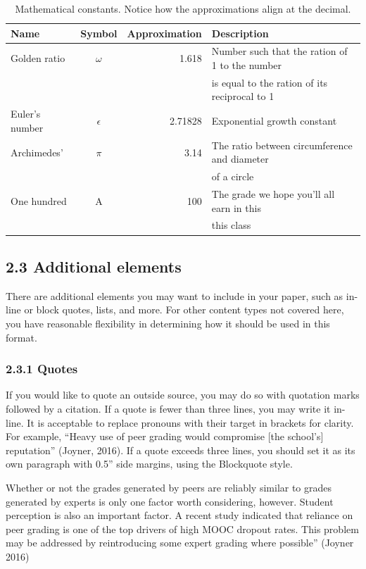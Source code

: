 {{{{\begin{table}[H]
  \centering
  \caption{Mathematical constants. Notice how the approximations align at the decimal.}
  \label{table:1}
  \begin{tabular}{l|c|r|l}
    \textbf{Name} & \textbf{Symbol} & \textbf{Approximation} & \textbf{Description}\\
    \hline
    Golden ratio & $\omega$ & 1.618 & Number such that the ration of 1 to the number\\
    & & & is equal to the ration of its reciprocal to 1\\
    \hline
    Euler's number & $\epsilon$ & 2.71828 & Exponential growth constant\\
    \hline
    Archimedes' & $\pi$ & 3.14 & The ratio between circumference and diameter\\
    & & & of a circle\\
    \hline
    One hundred & A\super{+} & 100 & The grade we hope you'll all earn in this\\
    & & & this class
  \end{tabular}
\end{table}

\subsection*{2.3 Additional elements}
There are additional elements you may want to include in your paper, such as in-line or block quotes, lists, and more. For other content types not covered here, you have reasonable flexibility in determining how it should be used in this format.

\subsubsection*{2.3.1 Quotes}
If you would like to quote an outside source, you may do so with quotation marks followed by a citation. If a quote is fewer than three lines, you may write it in-line. It is acceptable to replace pronouns with their target in brackets for clarity. For example, “Heavy use of peer grading would compromise [the school’s] reputation” (Joyner, 2016). If a quote exceeds three lines, you should set it as its own paragraph with 0.5'' side margins, using the Blockquote style.

\begin{quoting}
Whether or not the grades generated by peers are reliably similar to grades
generated by experts is only one factor worth considering, however. Student
perception is also an important factor. A recent study indicated that reliance
on peer grading is one of the top drivers of high MOOC dropout rates. This
problem may be addressed by reintroducing some expert grading where possible''
(Joyner 2016)
\end{quoting}

}}}}
